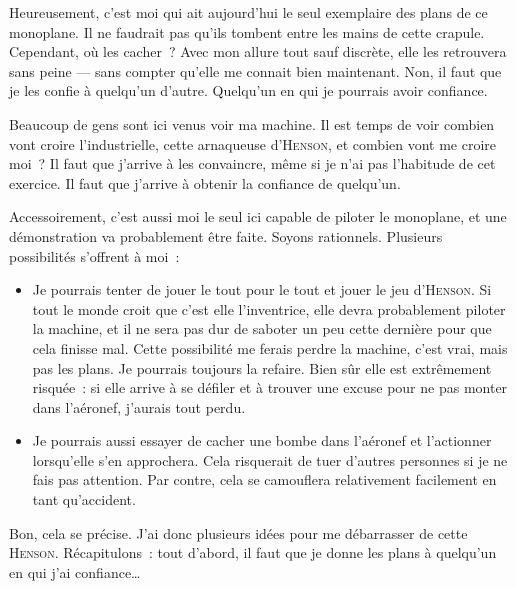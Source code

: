 {Heureusement, c’est moi qui ait aujourd’hui le seul exemplaire des plans de ce monoplane.
Il ne faudrait pas qu’ils tombent entre les mains de cette crapule.
Cependant, où les cacher~?  Avec mon allure tout sauf discrète, elle les retrouvera sans peine — sans compter qu’elle me connait bien maintenant.
Non, il faut que je les confie à quelqu’un d’autre.
Quelqu’un en qui je pourrais avoir confiance.

Beaucoup de gens sont ici venus voir ma machine.
Il est temps de voir combien vont croire l’industrielle, cette arnaqueuse d’\textsc{Henson}, et combien vont me croire moi~?
Il faut que j’arrive à les convaincre, même si je n’ai pas l’habitude de cet exercice.
Il faut que j’arrive à obtenir la confiance de quelqu’un.

Accessoirement, c’est aussi moi le seul ici capable de piloter le monoplane, et une démonstration va probablement être faite.
Soyons rationnels.  Plusieurs possibilités s’offrent à moi~:
\begin{itemize}
	\item Je pourrais tenter de jouer le tout pour le tout et jouer le jeu d’\textsc{Henson}.
		Si tout le monde croit que c’est elle l’inventrice, elle devra probablement piloter la machine, et il ne sera pas dur de saboter un peu cette dernière pour que cela finisse mal.
		Cette possibilité me ferais perdre la machine, c’est vrai, mais pas les plans.
		Je pourrais toujours la refaire.
		Bien sûr elle est extrêmement risquée~:  si elle arrive à se défiler et à trouver une excuse pour ne pas monter dans l’aéronef, j’aurais tout perdu.
	\item Je pourrais aussi essayer de cacher une bombe dans l’aéronef et l’actionner lorsqu’elle s’en approchera.
		Cela risquerait de tuer d’autres personnes si je ne fais pas attention.
		Par contre, cela se camouflera relativement facilement en tant qu’accident.
\end{itemize}

Bon, cela se précise.  J’ai donc plusieurs idées pour me débarrasser de cette \textsc{Henson}.
Récapitulons~:  tout d’abord, il faut que je donne les plans à quelqu’un en qui j’ai confiance…
}

